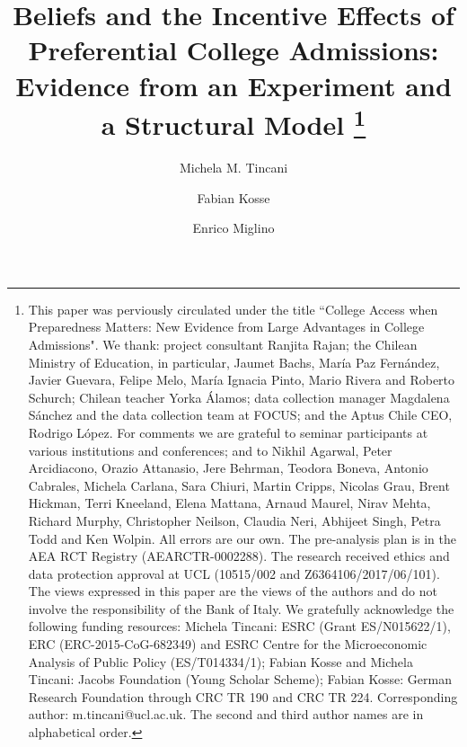 \documentclass[english,letterpaper,12pt]{article}
\title{Beliefs and the Incentive Effects of Preferential College Admissions: Evidence from an Experiment and a Structural Model \thanks{This paper was perviously circulated under the title ``College Access when Preparedness Matters: New Evidence from Large Advantages in College Admissions". We thank: project consultant Ranjita Rajan; the Chilean Ministry of Education, in particular, Jaumet Bachs, Mar\'{i}a Paz Fern\'{a}ndez, Javier Guevara, Felipe Melo, Mar\'{i}a Ignacia Pinto, Mario Rivera and Roberto Schurch; Chilean teacher Yorka \'{A}lamos; data collection manager Magdalena S\'{a}nchez and the data collection team at FOCUS; and the Aptus Chile CEO, Rodrigo L\'{o}pez. For comments we are grateful to seminar participants at various institutions and conferences; and to Nikhil Agarwal, Peter Arcidiacono, Orazio Attanasio, Jere Behrman, Teodora Boneva, Antonio Cabrales, Michela Carlana, Sara Chiuri, Martin Cripps, Nicolas Grau, Brent Hickman, Terri Kneeland, Elena Mattana, Arnaud Maurel, Nirav Mehta, Richard Murphy, Christopher Neilson, Claudia Neri, Abhijeet Singh, Petra Todd and Ken Wolpin. All errors are our own. The pre-analysis plan is in the AEA RCT Registry (AEARCTR-0002288). The research received ethics and data protection approval at UCL (10515/002 and Z6364106/2017/06/101). The views expressed in this
paper are the views of the authors and do not involve the responsibility of the Bank of Italy. We gratefully acknowledge the following funding resources: Michela Tincani: ESRC (Grant ES/N015622/1), ERC (ERC-2015-CoG-682349) and ESRC Centre for the Microeconomic Analysis of Public Policy (ES/T014334/1); Fabian Kosse and Michela Tincani: Jacobs Foundation (Young Scholar Scheme); Fabian Kosse: German Research Foundation through CRC TR 190 and CRC TR 224. Corresponding author: m.tincani@ucl.ac.uk. The second and third author names are in alphabetical order. } \\
}
\author[1]{ Michela M. Tincani}
\author[2]{ Fabian Kosse}
\author[3]{ Enrico Miglino}
\affil[1]{\small University College London, IFS, CEPR, \& LEAP}
\affil[2]{\small University of Würzburg, IZA \& CESifo}
\affil[3]{\small Bank of Italy}
\date{\parbox{\linewidth}{\centering%
		\today\endgraf%
}}
\begin{document}
	\maketitle
	\newpage
	\begin{singlespacing}
		\begin{abstract}
			\vskip-2pt	
			
		\end{abstract}
	\end{singlespacing}
	
	    
	
	\onehalfspacing
	\newpage

   
	
	
	
	
	
	
	
	
   


	
\end{document}

